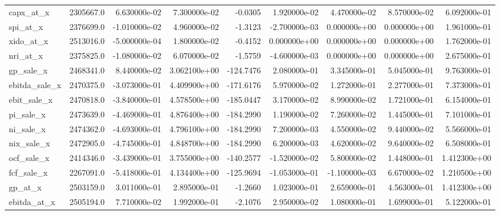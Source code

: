 \documentclass[12pt]{article}
\begin{document}
\begin{landscape}
\begin{longtable}{|l|r|r|r|r|r|r|r|r|}
capx\_at\_x               &  2305667.0 &  6.630000e-02 &  7.300000e-02 &     -0.0305 &  1.920000e-02 &  4.470000e-02 &  8.570000e-02 &  6.092000e-01 \\
spi\_at\_x                &  2376699.0 & -1.010000e-02 &  4.960000e-02 &     -1.3123 & -2.700000e-03 &  0.000000e+00 &  0.000000e+00 &  1.961000e-01 \\
xido\_at\_x               &  2513016.0 & -5.000000e-04 &  1.800000e-02 &     -0.4152 &  0.000000e+00 &  0.000000e+00 &  0.000000e+00 &  1.762000e-01 \\
nri\_at\_x                &  2375825.0 & -1.080000e-02 &  6.070000e-02 &     -1.5759 & -4.600000e-03 &  0.000000e+00 &  0.000000e+00 &  2.675000e-01 \\
gp\_sale\_x               &  2468341.0 &  8.440000e-02 &  3.062100e+00 &   -124.7476 &  2.080000e-01 &  3.345000e-01 &  5.045000e-01 &  9.763000e-01 \\
ebitda\_sale\_x           &  2470375.0 & -3.073000e-01 &  4.409900e+00 &   -171.6176 &  5.970000e-02 &  1.272000e-01 &  2.277000e-01 &  7.373000e-01 \\
ebit\_sale\_x             &  2470818.0 & -3.840000e-01 &  4.578500e+00 &   -185.0447 &  3.170000e-02 &  8.990000e-02 &  1.721000e-01 &  6.154000e-01 \\
pi\_sale\_x               &  2473639.0 & -4.469000e-01 &  4.876400e+00 &   -184.2990 &  1.190000e-02 &  7.260000e-02 &  1.445000e-01 &  7.101000e-01 \\
ni\_sale\_x               &  2474362.0 & -4.693000e-01 &  4.796100e+00 &   -184.2990 &  7.200000e-03 &  4.550000e-02 &  9.440000e-02 &  5.566000e-01 \\
nix\_sale\_x              &  2472905.0 & -4.745000e-01 &  4.848700e+00 &   -184.2990 &  6.200000e-03 &  4.620000e-02 &  9.640000e-02 &  6.508000e-01 \\
ocf\_sale\_x              &  2414346.0 & -3.439000e-01 &  3.755000e+00 &   -140.2577 & -1.520000e-02 &  5.800000e-02 &  1.448000e-01 &  1.412300e+00 \\
fcf\_sale\_x              &  2267091.0 & -5.418000e-01 &  4.134400e+00 &   -125.9694 & -1.053000e-01 & -1.100000e-03 &  6.670000e-02 &  1.210500e+00 \\
gp\_at\_x                 &  2503159.0 &  3.011000e-01 &  2.895000e-01 &     -1.2660 &  1.023000e-01 &  2.659000e-01 &  4.563000e-01 &  1.412300e+00 \\
ebitda\_at\_x             &  2505194.0 &  7.710000e-02 &  1.992000e-01 &     -2.1076 &  2.950000e-02 &  1.080000e-01 &  1.699000e-01 &  5.122000e-01 \\

\end{longtable}
\end{landscape}
\end{document}
